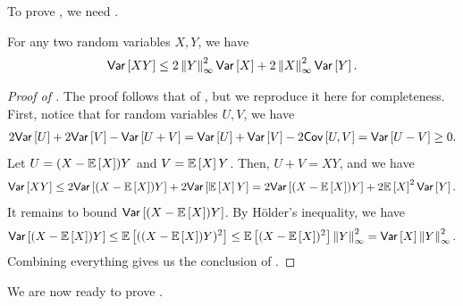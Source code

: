 To prove , we need .
\begin{lemma}
\label{lemma:variance_rv_bound}
For any two random variables $X, Y$, we have
\begin{align*}
    \var{XY} \le 2\maxnorm{Y}^2\var{X}+2\maxnorm{X}^2\var{Y}.
\end{align*}
\end{lemma}
\begin{proof}[Proof of ]
The proof follows that of \cite{var_stackexchange}, but we reproduce it here for completeness. First, notice that for random variables $U, V$, we have
\begin{align*}
    2\var{U}+2\var{V} - \var{U+V} = \var{U}+\var{V}-2\cov{U,V} = \var{U-V} \ge 0.
\end{align*}
Let $U=(X-\exv{X})Y$ and $V=\exv{X}Y$. Then, $U+V=XY$, and we have
\begin{align*}
    \var{XY} \le 2\var{(X-\exv{X})Y}+2\var{\exv{X}Y}=2\var{(X-\exv{X})Y}+2\exv{X}^2\var{Y}.
\end{align*}
It remains to bound $\var{(X-\exv{X})Y}$. By H\"older's inequality, we have
\begin{align*}
    \var{(X-\exv{X})Y} \le \exv{((X-\exv{X})Y)^2} \le \exv{(X-\exv{X})^2}\maxnorm{Y}^2=\var{X}\maxnorm{Y}^2.
\end{align*}
Combining everything gives us the conclusion of .
\end{proof}
We are now ready to prove .
